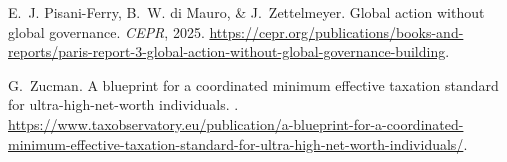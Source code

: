 \documentclass[12pt,english]{article}
\begin{document}
\begin{bibunit}
\begin{thebibliography}{9}
E.~J. {Pisani-Ferry}, B.~W. {di Mauro}, \& J.~Zettelmeyer.
\newblock Global action without global governance.
\newblock \emph{CEPR}, 2025.
\newblock
  \url{https://cepr.org/publications/books-and-reports/paris-report-3-global-action-without-global-governance-building}.

G.~Zucman.
\newblock A blueprint for a coordinated minimum effective taxation standard for
  ultra-high-net-worth individuals.
.
\newblock
  \url{https://www.taxobservatory.eu/publication/a-blueprint-for-a-coordinated-minimum-effective-taxation-standard-for-ultra-high-net-worth-individuals/}.

\end{thebibliography}

\end{bibunit}
\end{document}
